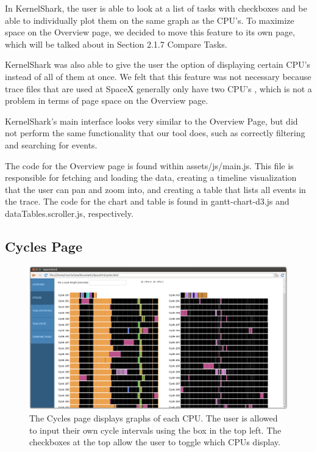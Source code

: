 \documentclass{hmcclinic}
\begin{document}
    In KernelShark, the user is able to look at a list of tasks with checkboxes and be able to individually plot them on the same graph as the CPU's. To maximize space on the Overview page, we decided to move this feature to its own page, which will be talked about in Section 2.1.7 Compare Tasks. 
    
    KernelShark was also able to give the user the option of displaying certain CPU's instead of all of them at once. We felt that this feature was not necessary because trace files that are used at SpaceX generally only have two CPU's , which is not a problem in terms of page space on the Overview page.
    
    KernelShark's main interface looks very similar to the Overview Page, but did not perform the same functionality that our tool does, such as correctly filtering and searching for events.

    The code for the Overview page is found within assets/js/main.js. This file is
    responsible for fetching and loading the data, creating a timeline
    visualization that the user can pan and zoom into, and creating a table that
    lists all events in the trace. The code for the chart and table is found in
    gantt-chart-d3.js and dataTables.scroller.js, respectively.
    
  \subsection{Cycles Page} %

  \begin{figure}[H]
  \centering
      \includegraphics[width=5in]{cycles-page.png}
  \caption{The Cycles page displays graphs of each CPU. The user is allowed to
  input their own cycle intervals using the box in the top left. The checkboxes
at the top allow the user to toggle which CPUs display.}
  \end{figure}
  
\end{document}
